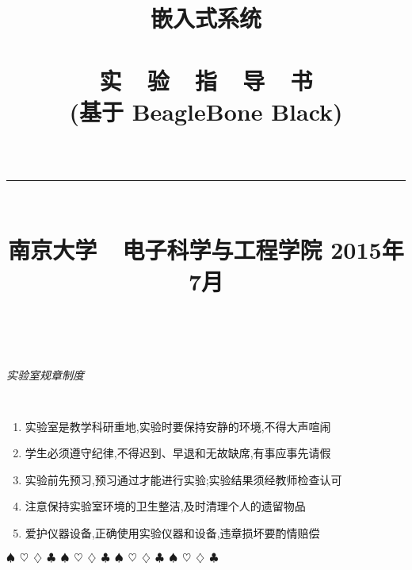 \documentclass[a4paper,11pt]{book}
\title{
\begin{flushright}
\bf 嵌入式系统 \\ \ \\
 \textsf{实\ \ 验\ \ 指\ \ 导\ \ 书\\
(基于 BeagleBone Black)} \\ \ \\
\rule[10pt]{.6\textwidth}{2pt}\\
\large \textsf{南京大学~~电子科学与工程学院}
\vskip 4cm 2015年7月
\end{flushright}
}
\author{}
\date{}
\begin{document}
\maketitle
{}
\setlength{\parindent}{2em}
\setlength\doublerulesep{.2pt}

\baselineskip=17pt
\tableofcontents

\newpage
 ~ \vskip 2cm

\begin{center} \LARGE \it \textsf{实验室规章制度} \end{center}
\large \tt
\begin{enumerate}\itemsep=-5pt
  \item 实验室是教学科研重地,实验时要保持安静的环境,不得大声喧闹
  \item 学生必须遵守纪律,不得迟到、早退和无故缺席,有事应事先请假
  \item 实验前先预习,预习通过才能进行实验;实验结果须经教师检查认可
  \item 注意保持实验室环境的卫生整洁,及时清理个人的遗留物品
  \item 爱护仪器设备,正确使用实验仪器和设备,违章损坏要酌情赔偿
\end{enumerate}

\vspace{4mm}\begin{center}
$\spadesuit~~ \heartsuit~~ \diamondsuit~~ \clubsuit~~
\spadesuit~~ \heartsuit~~ \diamondsuit~~ \clubsuit~~
\spadesuit~~ \heartsuit~~ \diamondsuit~~ \clubsuit~~
\spadesuit~~ \heartsuit~~ \diamondsuit~~ \clubsuit~~$
\end{center}\vspace{4mm}


\baselineskip=17pt












\end{document}
